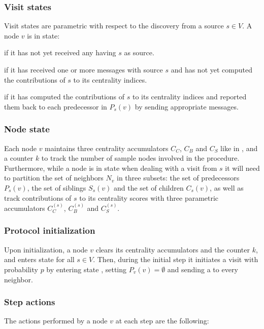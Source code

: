 \subsubsection{Visit states}

Visit states are parametric with respect to the discovery from a source $s \in V$. A node $v$ is in state:
\begin{description}[leftmargin=0cm]
\item[\swait{s}] if it has not yet received any \mdisc{} having $s$ as source.
\item[\sact{s}] if it has received one or more \mdisc{} messages with source $s$ and has not yet computed the contributions of $s$ to its centrality indices.
\item[\scomp{s}] if it has computed the contributions of $s$ to its centrality indices and reported them back to each predecessor in $P_s(v)$ by sending appropriate \mrep{} messages.
\end{description}

\subsubsection{Node state}
Each node $v$ maintains three centrality accumulators $C_C$, $C_B$ and $C_S$ like in \deccen{}, and a counter $k$ to track the number of sample nodes involved in the procedure. Furthermore, while a node is in state  when dealing with a visit from $s$ it will need to partition the set of neighbors $N_v$ in three subsets: the set of predecessors $P_s(v)$, the set of siblings $S_s(v)$ and the set of children $C_s(v)$, as well as track contributions of $s$ to its centrality scores with three parametric accumulators $C_C^{(s)}$, $C_B^{(s)}$ and $C_S^{(s)}$.

\subsubsection{Protocol initialization}
Upon initialization, a node $v$ clears its centrality accumulators and the counter $k$, and enters state  for all $s \in V$. Then, during the initial step it initiates a visit with probability $p$ by entering state , setting $P_v(v) = \emptyset$ and sending a  to every neighbor.

\subsubsection{Step actions}
\label{multibfs:step}
The actions performed by a node $v$ at each step are the following:

